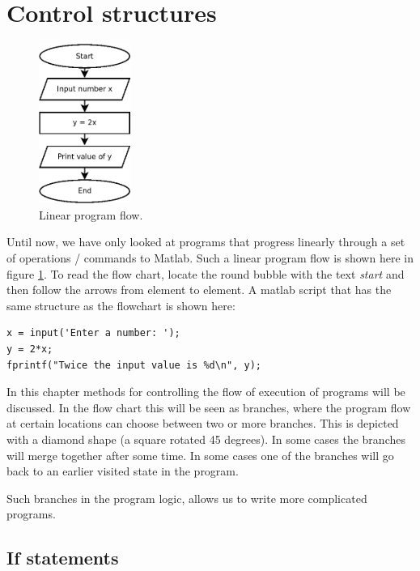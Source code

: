 \section{Control structures}

\begin{figure}
\centering
\includegraphics[width=3cm]{pic/flowchart_linear_program_flow.png}
\caption{Linear program flow.}
\label{figLinearProgramFlow}
\end{figure}
Until now, we have only looked at programs that progress linearly through a set of 
operations / commands to Matlab.
Such a linear program flow is shown here in figure \ref{figLinearProgramFlow}.
To read the flow chart, locate the round bubble with the 
text \emph{start} and then follow the arrows from element to 
element.
A matlab script that has the same structure as the flowchart is shown here:
\begin{lstlisting}
x = input('Enter a number: ');
y = 2*x;
fprintf("Twice the input value is %d\n", y);
\end{lstlisting}



In this chapter methods for controlling the flow of execution of programs will be 
discussed.
In the flow chart this will be seen as branches, where the program flow at certain 
locations can choose between two or more branches. 
This is depicted with a diamond shape (a square rotated 45 degrees).
In some cases the branches will merge together after some time.
In some cases one of the branches will go back to an earlier visited state in the program.

Such branches in the program logic, allows us to write more complicated programs.


\subsection{If statements}

